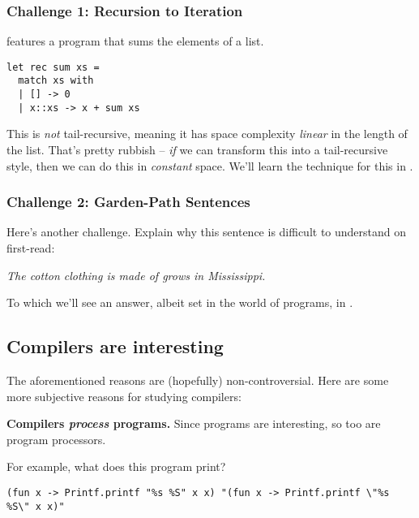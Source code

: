 \subsubsection{Challenge 1: Recursion to Iteration}
 features a program that sums the elements of a list.

\begin{code}
\label{code:cps-challenge}
\begin{verbatim}
let rec sum xs = 
  match xs with
  | [] -> 0
  | x::xs -> x + sum xs
\end{verbatim}
\end{code}

This is \emph{not} tail-recursive, meaning it has space complexity \emph{linear} in the length of the list. That's pretty rubbish -- \emph{if} we can transform this into a tail-recursive style, then we can do this in \emph{constant} space. We'll learn the technique for this in .

\subsubsection{Challenge 2: Garden-Path Sentences}
Here's another challenge. Explain why this sentence is difficult to understand on first-read:

\begin{center}
    \textit{The cotton clothing is made of grows in Mississippi.}
\end{center}

To which we'll see an answer, albeit set in the world of programs, in .

\subsection{Compilers are interesting}
The aforementioned reasons are (hopefully) non-controversial. Here are some more subjective reasons for studying compilers:

\textbf{Compilers \emph{process} programs.} Since programs are interesting, so too are program processors.

For example, what does this program \cite{drup-2018} print?

\begin{code}
\begin{verbatim}
(fun x -> Printf.printf "%s %S" x x) "(fun x -> Printf.printf \"%s %S\" x x)"
\end{verbatim}
\end{code}

